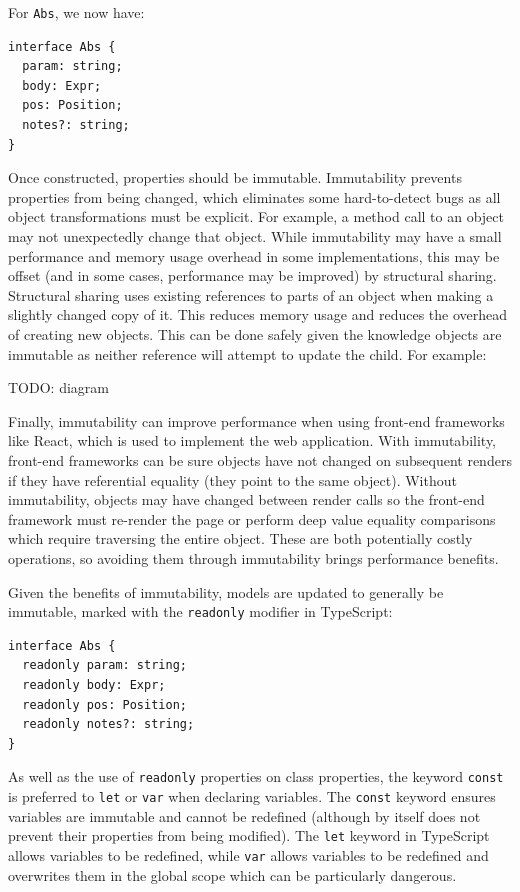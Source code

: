 \documentclass[a4paper,fleqn,oneside,12pt]{report}
\begin{document}
For \texttt{Abs}, we now have:

\begin{verbatim}
interface Abs {
  param: string;
  body: Expr;
  pos: Position;
  notes?: string;
}
\end{verbatim}
Once constructed, properties should be immutable. Immutability prevents properties from being changed, which eliminates some hard-to-detect bugs as all object transformations must be explicit. For example, a method call to an object may not unexpectedly change that object. While immutability may have a small performance and memory usage overhead in some implementations, this may be offset (and in some cases, performance may be improved) by structural sharing. Structural sharing uses existing references to parts of an object when making a slightly changed copy of it. This reduces memory usage and reduces the overhead of creating new objects. This can be done safely given the knowledge objects are immutable as neither reference will attempt to update the child. For example:

TODO: diagram

Finally, immutability can improve performance when using front-end frameworks like React, which is used to implement the web application. With immutability, front-end frameworks can be sure objects have not changed on subsequent renders if they have referential equality (they point to the same object). Without immutability, objects may have changed between render calls so the front-end framework must re-render the page or perform deep value equality comparisons which require traversing the entire object. These are both potentially costly operations, so avoiding them through immutability brings performance benefits.

Given the benefits of immutability, models are updated to generally be immutable, marked with the \texttt{readonly} modifier in TypeScript:

\begin{verbatim}
interface Abs {
  readonly param: string;
  readonly body: Expr;
  readonly pos: Position;
  readonly notes?: string;
}
\end{verbatim}
As well as the use of \texttt{readonly} properties on class properties, the keyword \texttt{const} is preferred to \texttt{let} or \texttt{var} when declaring variables. The \texttt{const} keyword ensures variables are immutable and cannot be redefined (although by itself does not prevent their properties from being modified). The \texttt{let} keyword in TypeScript allows variables to be redefined, while \texttt{var} allows variables to be redefined and overwrites them in the global scope which can be particularly dangerous.
\end{document}
